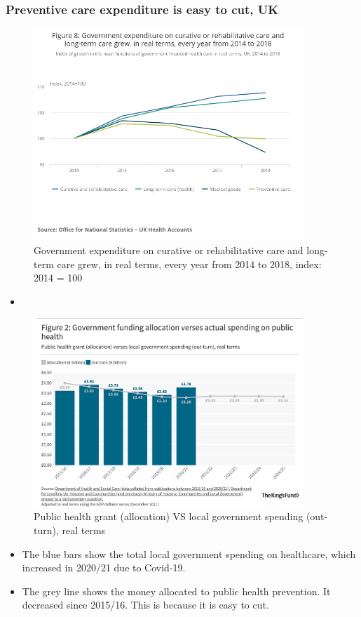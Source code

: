 \subsubsection{Preventive care expenditure is easy to cut, UK}
        \begin{figure}[H]%
                \centering
                \includegraphics[width=4in]{images/ch3/19.png}
                \caption{Government expenditure on curative or rehabilitative care and long-term care grew, in real terms, every year from 2014 to 2018, index: 2014 = 100}
            \end{figure}
\begin{itemize}           
        \item {}
        \end{itemize} 

        \begin{figure}[H]%
                \centering
                \includegraphics[width=4in]{images/ch3/20.png}
                \caption{Public health grant (allocation) VS local government spending (out-turn), real terms}
            \end{figure}
\begin{itemize}           
        \item The blue bars show the total local government spending on healthcare, which increased in 2020/21 due to Covid-19.
        \item The grey line shows the money allocated to public health prevention. It decreased since 2015/16. This is because it is easy to cut. 
        \end{itemize} 
        
